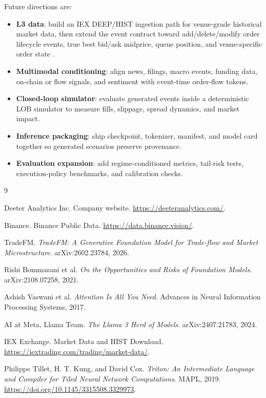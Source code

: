 \documentclass[11pt]{article}
\begin{document}
Future directions are:

\begin{itemize}[leftmargin=1.6em]
  \item \textbf{L3 data}: build an IEX DEEP/HIST ingestion path for
  venue-grade historical market data, then extend the event contract toward
  add/delete/modify order lifecycle events, true best bid/ask midprice, queue
  position, and venue-specific order state \cite{iexmarketdata}.
  \item \textbf{Multimodal conditioning}: align news, filings, macro events,
  funding data, on-chain or flow signals, and sentiment with event-time
  order-flow tokens.
  \item \textbf{Closed-loop simulator}: evaluate generated events inside a
  deterministic LOB simulator to measure fills, slippage, spread dynamics, and
  market impact.
  \item \textbf{Inference packaging}: ship checkpoint, tokenizer, manifest, and
  model card together so generated scenarios preserve provenance.
  \item \textbf{Evaluation expansion}: add regime-conditioned metrics,
  tail-risk tests, execution-policy benchmarks, and calibration checks.
\end{itemize}

\begin{thebibliography}{9}

Deeter Analytics Inc.
\newblock Company website.
\newblock \url{https://deeteranalytics.com/}.

Binance.
\newblock Binance Public Data.
\newblock \url{https://data.binance.vision/}.

TradeFM.
\newblock \emph{TradeFM: A Generative Foundation Model for Trade-flow and
Market Microstructure}.
\newblock arXiv:2602.23784, 2026.

Rishi Bommasani et al.
\newblock \emph{On the Opportunities and Risks of Foundation Models}.
\newblock arXiv:2108.07258, 2021.

Ashish Vaswani et al.
\newblock \emph{Attention Is All You Need}.
\newblock Advances in Neural Information Processing Systems, 2017.

AI at Meta, Llama Team.
\newblock \emph{The Llama 3 Herd of Models}.
\newblock arXiv:2407.21783, 2024.

IEX Exchange.
\newblock Market Data and HIST Download.
\newblock \url{https://iextrading.com/trading/market-data/}.

Philippe Tillet, H. T. Kung, and David Cox.
\newblock \emph{Triton: An Intermediate Language and Compiler for Tiled Neural
Network Computations}.
\newblock MAPL, 2019. \url{https://doi.org/10.1145/3315508.3329973}.

\end{thebibliography}
\end{document}
